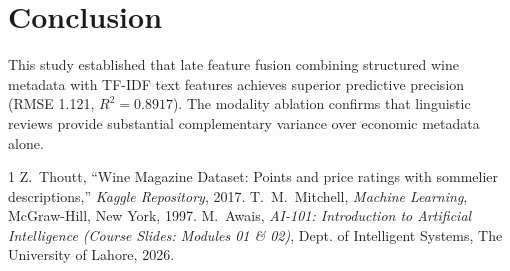\documentclass[10pt,journal,compsoc,twocolumn]{IEEEtran}
\begin{document}
\section{Conclusion}
This study established that late feature fusion combining structured wine metadata with TF-IDF text features achieves superior predictive precision (RMSE 1.121, $R^2 = 0.8917$). The modality ablation confirms that linguistic reviews provide substantial complementary variance over economic metadata alone.

\begin{thebibliography}{1}
Z.~Thoutt, ``Wine Magazine Dataset: Points and price ratings with sommelier descriptions,'' \emph{Kaggle Repository}, 2017.
T.~M.~Mitchell, \emph{Machine Learning}, McGraw-Hill, New York, 1997.
M.~Awais, \emph{AI-101: Introduction to Artificial Intelligence (Course Slides: Modules 01 \& 02)}, Dept. of Intelligent Systems, The University of Lahore, 2026.
\end{thebibliography}
\end{document}
